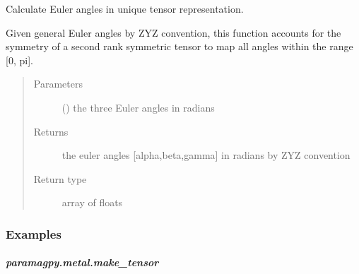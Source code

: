 \documentclass[a4paper,10pt,english,openany,oneside]{sphinxmanual}
\begin{document}
\begin{fulllineitems}
\label{\detokenize{reference/generated/paramagpy.metal.unique_eulers:paramagpy.metal.unique_eulers}}
Calculate Euler angles in unique tensor representation.

Given general Euler angles by ZYZ convention, this function accounts for
the symmetry of a second rank symmetric tensor to map all angles within
the range {[}0, pi{]}.
\begin{quote}\begin{description}
\item[{Parameters}] \leavevmode
{} () \textendash{} the three Euler angles in radians

\item[{Returns}] \leavevmode
{} \textendash{} the euler angles {[}alpha,beta,gamma{]} in radians
by ZYZ convention

\item[{Return type}] \leavevmode
array of floats

\end{description}\end{quote}
\subsubsection*{Examples}

%
\begin{sphinxVerbatim}[commandchars=\\\{\}]
  \PYG{p}{[}\PYG{p}{]}
\end{sphinxVerbatim}

\end{fulllineitems}



\subparagraph{paramagpy.metal.make\_tensor}
\label{\detokenize{reference/generated/paramagpy.metal.make_tensor:paramagpy-metal-make-tensor}}\label{\detokenize{reference/generated/paramagpy.metal.make_tensor::doc}}
\end{document}
